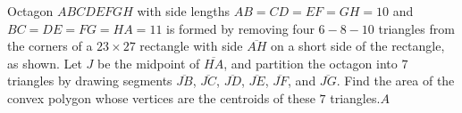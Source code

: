Octagon $ABCDEFGH$ with side lengths $AB = CD = EF = GH = 10$ and $BC=  DE = FG = HA = 11$ is formed by removing four $6-8-10$ triangles from the corners of a $23\times 27$ rectangle with side $\overline{AH}$ on a short side of the rectangle, as shown. Let $J$ be the midpoint of $\overline{HA}$,  and partition the octagon into $7$ triangles by drawing segments $\overline{JB}$,  $\overline{JC}$,  $\overline{JD}$,  $\overline{JE}$,  $\overline{JF}$,  and $\overline{JG}$. Find the area of the convex polygon whose vertices are the centroids of these $7$ triangles.$A$